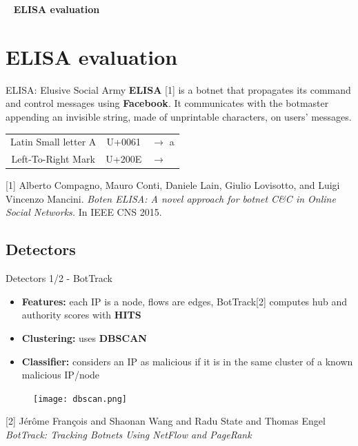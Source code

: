 \documentclass{beamer}
\begin{document}
	\begin{frame}{\ }
		\Huge \textbf{ELISA evaluation}
	\end{frame}

	\section{ELISA evaluation}
	
	\begin{frame}{ELISA: Elusive Social Army}
		\textbf{ELISA} [1] is a botnet that propagates its command and control messages using \textbf{Facebook}. It communicates with the botmaster appending an invisible string, made of unprintable characters, on users' messages.
		
		\begin{longtable}{c c l}
			Latin Small letter A & U+0061 & $\rightarrow$ a \\
			Left-To-Right Mark & U+200E & $\rightarrow$
		\end{longtable}
		{\footnotesize
			[1] Alberto Compagno, Mauro Conti, Daniele Lain, Giulio Lovisotto, and Luigi Vincenzo Mancini. \textit{Boten ELISA: A novel approach for botnet C\&C in Online Social Networks.} In IEEE CNS 2015. \par
		}
	\end{frame}

	\subsection{Detectors}

	\begin{frame}{Detectors 1/2 - BotTrack}
		\begin{minipage}{.6\textwidth}
		\begin{itemize}
			\item \textbf{Features:} each IP is a node, flows are edges, BotTrack[2] computes hub and authority scores with \textbf{HITS}
			\item \textbf{Clustering:} uses \textbf{DBSCAN}
			\item \textbf{Classifier:} considers an IP as malicious if it is in the same cluster of a known malicious IP/node
		\end{itemize}
		\end{minipage}%
		\begin{minipage}{.45\textwidth}
			\vspace{-1cm}
			\begin{figure}
				\texttt{[image: dbscan.png]}
			\end{figure}
		\end{minipage}
		
		{\footnotesize \vspace{.25cm}
			[2]	Jér\^ome François and Shaonan Wang and Radu State and Thomas Engel \emph{BotTrack: Tracking Botnets Using NetFlow and PageRank} \par
		}
	\end{frame}
	
\end{document}
